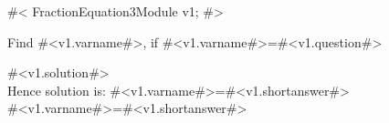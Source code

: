 

#<
FractionEquation3Module v1;
#>

Find #<v1.varname#>, if #<v1.varname#>=#<v1.question#>

#<v1.solution#>\\ [1.8mm]
Hence solution is: #<v1.varname#>=#<v1.shortanswer#> \\[1.8mm]

#<v1.varname#>=#<v1.shortanswer#>


